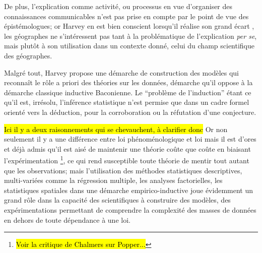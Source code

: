 De plus, l'explication comme activité, ou processus en vue d'organiser des connaissances communicables n'est pas prise en compte par le point de vue des épistémologues; or Harvey en est bien conscient lorsqu'il réalise son grand écart \autocite[10]{Harvey1969}, les géographes ne s’intéressent pas tant à la problématique de l'explication \textit{per se}, mais plutôt à son utilisation dans un contexte donné, celui du champ scientifique des géographes.

Malgré tout, Harvey propose une démarche de construction des modèles qui reconnaît le rôle a priori des théories sur les données, démarche qu'il oppose à la démarche classique inductive Baconienne. Le \enquote{problème de l'induction} étant ce qu'il est, irrésolu, l'inférence statistique n'est permise que dans un cadre formel orienté vers la déduction, pour la corroboration ou la réfutation d'une conjecture.

\hl{Ici il y a deux raisonnements qui se chevauchent, à clarifier donc }
Or non seulement il y a une différence entre loi phénoménologique et loi mais il est d'ores et déjà admis qu'il est aisé de maintenir une théorie coûte que coûte en biaisant l'expérimentation \footnote{\hl{Voir la critique de Chalmers sur Popper...} }, ce qui rend susceptible toute théorie de mentir tout autant que les observations; mais l'utilisation des méthodes statistiques descriptives, multi-variées comme la régression multiple, les analyses factorielles, les statistiques spatiales dans une démarche empirico-inductive joue évidemment un grand rôle dans la capacité des scientifiques à construire des modèles, des expérimentations permettant de comprendre la complexité des masses de données en dehors de toute dépendance à une loi. %


